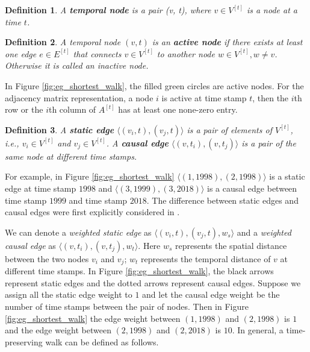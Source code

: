 \documentclass[12pt]{article}
\newtheorem{definition}{Definition}
\theoremstyle{definition}
\begin{document}
\begin{definition}
  A \textbf{temporal node} is a pair (v, t), where $v \in V^{[t]}$ is a node at a time $t$.
\end{definition}


\begin{definition}
  A temporal node $(v, t)$ is an \textbf{active node} if there exists at least one edge $e \in E^{[t]}$ that connects $v \in V^{[t]}$ to another node $w \in V^{[t]}, w\ne v$. Otherwise it is called an inactive node.
\end{definition}

In Figure \ref{fig:eg_shortest_walk}, the filled green circles are active nodes. For the adjacency matrix representation, a node $i$ is active at time stamp $t$, then
the $i$th row or the $i$th column of $A^{[t]}$ has at least one none-zero entry.

 \begin{definition}
 A \textbf{static edge} $\langle (v_i, t), (v_j, t)\rangle$ is a pair of elements of $V^{[t]}$, i.e., $v_i \in V^{[t]}$ and
 $v_j \in V^{[t]}$.
  A \textbf{causal edge} $\langle (v, t_i), (v, t_j)\rangle$ is a pair of the same node at different time stamps.
 \end{definition}

 For example, in Figure \ref{fig:eg_shortest_walk}
 $\langle (1, 1998), (2, 1998) \rangle$ is a static edge at time stamp $1998$ and $\langle (3, 1999), (3, 2018) \rangle$ is a causal edge between time stamp $1999$ and time stamp $2018$.
 The difference between static edges and causal edges were first explicitly considered in \cite{chen16}.


 We can denote a \emph{weighted static edge} as $\langle (v_i, t), (v_j, t), w_s \rangle$ and a \emph{weighted causal edge} as $\langle (v, t_i), (v, t_j), w_t \rangle$.
 Here $w_s$ represents the spatial distance between the two nodes $v_i$ and $v_j$; $w_t$ represents the
 temporal distance of $v$ at different time stamps.
 In Figure \ref{fig:eg_shortest_walk}, the black arrows represent static edges and the dotted arrows represent causal edges.
 Suppose we assign all the static edge weight to $1$ and
 let the causal edge weight be the number of time stamps between the pair of nodes. Then in Figure \ref{fig:eg_shortest_walk}
 the edge weight between $(1, 1998)$ and $(2, 1998)$ is $1$ and the edge weight between $(2, 1998)$ and $(2, 2018)$ is $10$.
In general, a time-preserving walk can be defined as follows.
\end{document}
